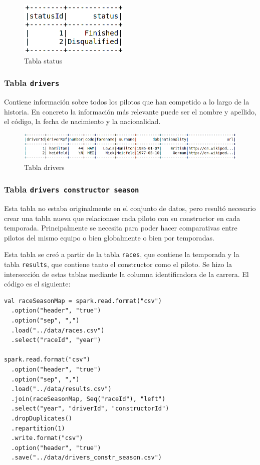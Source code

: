 \documentclass[12pt,twoside,titlepage]{report}
\begin{document}
\begin{figure}[H]
  \includegraphics[scale=0.7]{status_table.png}
  \centering
  \caption{Tabla status}
  \label{fig:statustable}
  \centering
\end{figure}

\subsubsection{Tabla \texttt{drivers}}

Contiene información sobre todos los pilotos que han competido a lo largo de la historia. En concreto la información más relevante puede ser el nombre y apellido, el código, la fecha de nacimiento y la nacionalidad. 

\begin{figure}[H]
  \includegraphics[scale=0.5]{driver_table.png}
  \centering
  \caption{Tabla drivers}
  \label{fig:driverstable}
  \centering
\end{figure}


\subsubsection{Tabla \texttt{drivers constructor season}} \label{drivconstseasontabexplanation}

Esta tabla no estaba originalmente en el conjunto de datos, pero resultó necesario crear una tabla nueva que relacionase cada piloto con su constructor en cada temporada. Principalmente se necesita para poder hacer comparativas entre pilotos del mismo equipo o bien globalmente o bien por temporadas. 

Esta tabla se creó a partir de la tabla \texttt{races}, que contiene la temporada y la tabla \texttt{results}, que contiene tanto el constructor como el piloto. Se hizo la intersección de estas tablas mediante la columna identificadora de la carrera. El código es el siguiente:


\begin{lstlisting}
val raceSeasonMap = spark.read.format("csv")
  .option("header", "true")
  .option("sep", ",")
  .load("../data/races.csv")
  .select("raceId", "year")

spark.read.format("csv")
  .option("header", "true")
  .option("sep", ",")
  .load("../data/results.csv")
  .join(raceSeasonMap, Seq("raceId"), "left")
  .select("year", "driverId", "constructorId")
  .dropDuplicates()
  .repartition(1)
  .write.format("csv")
  .option("header", "true")
  .save("../data/drivers_constr_season.csv")
\end{lstlisting}
\end{document}
